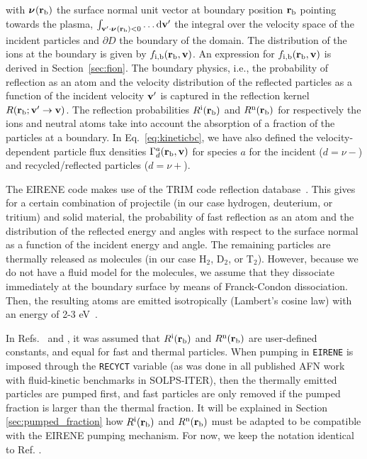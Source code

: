 \noindent with ${\boldsymbol \nu}_{}({\bf r}_{\mathrm{b}})$ the surface normal unit vector at boundary position ${\bf r}_{\mathrm{b}}$ pointing towards the plasma, $\int_{{\bf v}'\cdot{\boldsymbol \nu}_{}({\bf r}_{\mathrm{b}}) < 0} \ldots \mathrm{d} {\bf v}'$ the integral over the velocity space of the incident particles and $\partial D$ the boundary of the domain. The distribution of the ions at the boundary is given by $f_{\mathrm{i},\mathrm{b}}({\bf r}_{\mathrm{b}},{\bf v})$. An expression for $f_{\mathrm{i},\mathrm{b}}({\bf r}_{\mathrm{b}},{\bf v})$ is derived in Section~\ref{sec:fion}. The boundary physics, i.e., the probability of reflection as an atom and the velocity distribution of the reflected particles as a function of the incident velocity ${\bf v}'$ is captured in the reflection kernel $R({\bf r}_{\mathrm{b}};{\bf v}' \rightarrow {\bf v})$. The reflection probabilities $R^{\mathrm{i}}({\bf r}_{\mathrm{b}})$ and $R^{\mathrm{n}}({\bf r}_{\mathrm{b}})$ for respectively the ions and neutral atoms take into account the absorption of a fraction of the particles at a boundary. In Eq.~\eqref{eq:kineticbc}, we have also defined the velocity-dependent particle flux densities $\Gamma_{d}^{a}({\bf r}_{\mathrm{b}},{\bf v})$ for species $a$ for the incident ($d = \nu-$) and recycled/reflected particles ($d =\nu+$).

The EIRENE code makes use of the TRIM code reflection database~\cite{reiter2009eirene}. This gives for a certain combination of projectile (in our case hydrogen, deuterium, or tritium) and solid material, the probability of fast reflection as an atom and the distribution of the reflected energy and angles with respect to the surface normal as a function of the incident energy and angle. The remaining particles are thermally released as molecules (in our case H$_{2}$, D$_{2}$, or T$_{2}$). However, because we do not have a fluid model for the molecules, we assume that they dissociate immediately at the boundary surface by means of Franck-Condon dissociation. Then, the resulting atoms are emitted isotropically (Lambert's cosine law) with an energy of 2-3 eV~\cite{dunn1966franck}.

In Refs.~\cite{nf_niels} and \cite{phd_niels}, it was assumed that $R^{\mathrm{i}}({\bf r}_{\mathrm{b}})$ and $R^{\mathrm{n}}({\bf r}_{\mathrm{b}})$ are user-defined constants, and equal for fast and thermal particles. When pumping in {\tt EIRENE} is imposed  through the {\tt RECYCT} variable (as was done in all published AFN work with fluid-kinetic benchmarks in SOLPS-ITER), then the thermally emitted particles are pumped first, and fast particles are only removed if the pumped fraction is larger than the thermal fraction. It will be explained in Section \ref{sec:pumped_fraction} how $R^{\mathrm{i}}({\bf r}_{\mathrm{b}})$ and $R^{\mathrm{n}}({\bf r}_{\mathrm{b}})$ must be adapted to be compatible with the EIRENE pumping mechanism. For now, we keep the notation identical to Ref. \cite{phd_niels}. 

